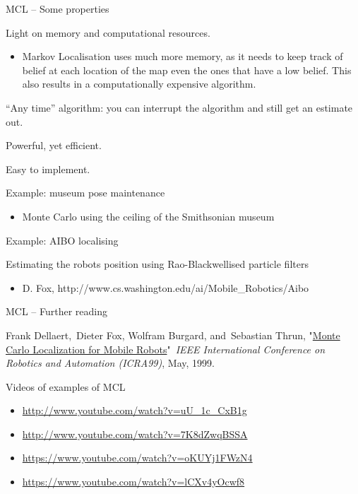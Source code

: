 \documentclass[compress]{beamer}
\begin{document}
\begin{frame}{MCL -- Some properties}

Light on memory and computational resources.

\begin{itemize}
\item Markov Localisation uses much more memory, as it needs to keep track
  of belief at each location of the map even the ones that have a low
  belief. This also results in a computationally expensive algorithm.
\end{itemize}

``Any time'' algorithm: you can interrupt the algorithm and still get an
estimate out.

Powerful, yet efficient.

Easy to implement.

\end{frame}

\begin{frame}{Example: museum pose maintenance}

\begin{itemize}
\item Monte Carlo using the ceiling of the Smithsonian museum
\end{itemize}

\end{frame}

\begin{frame}{Example: AIBO localising}

Estimating the robots position using Rao-Blackwellised particle filters

\begin{itemize}
\item D. Fox, http://www.cs.washington.edu/ai/Mobile\_Robotics/Aibo
\end{itemize}

\end{frame}

\begin{frame}{MCL -- Further reading}

Frank Dellaert,~Dieter Fox, Wolfram Burgard, and~Sebastian Thrun,
"\href{http://www.ri.cmu.edu/publication_view.html?pub_id=533}{Monte
Carlo Localization for Mobile Robots}"~\emph{IEEE International
Conference on Robotics and Automation (ICRA99)}, May, 1999.

Videos of examples of MCL

\begin{itemize}
\item \url{http://www.youtube.com/watch?v=uU_1c_CxB1g}
\item \url{http://www.youtube.com/watch?v=7K8dZwqBSSA}
\item \url{https://www.youtube.com/watch?v=oKUYj1FWzN4}
\item \url{https://www.youtube.com/watch?v=lCXv4yOcwf8}
\end{itemize}

\end{frame}
\end{document}
